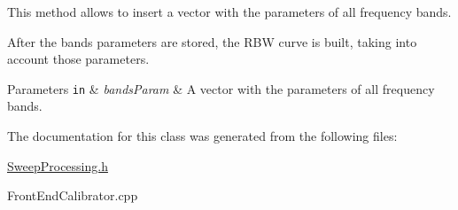 This method allows to insert a vector with the parameters of all frequency bands. 

After the bands\textquotesingle{} parameters are stored, the R\+BW curve is built, taking into account those parameters. 
\begin{DoxyParams}[1]{Parameters}
\mbox{\tt in}  & {\em bands\+Param} & A vector with the parameters of all frequency bands. \\
\hline
\end{DoxyParams}


The documentation for this class was generated from the following files\+:\begin{DoxyCompactItemize}
\item 
\hyperlink{SweepProcessing_8h}{Sweep\+Processing.\+h}\item 
Front\+End\+Calibrator.\+cpp\end{DoxyCompactItemize}
